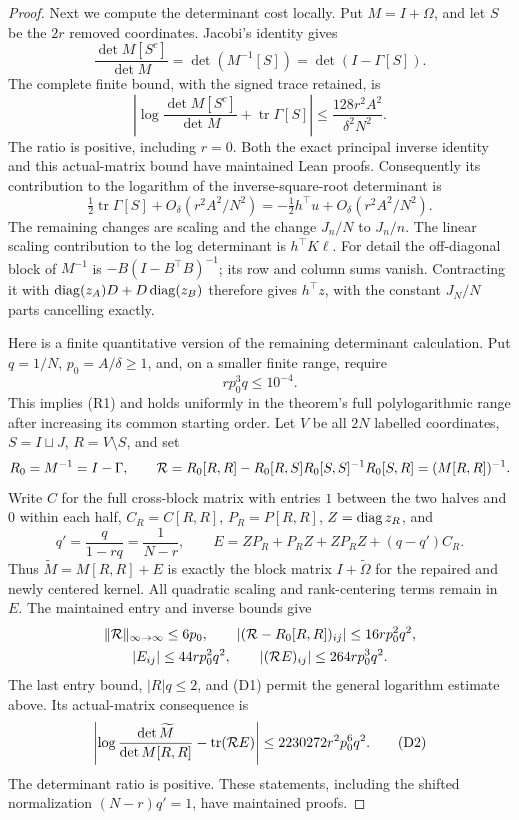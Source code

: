 \begin{proof}
Next we compute the determinant cost locally.
Put \(M=I+\Omega\), and let \(S\) be the \(2r\) removed
coordinates. Jacobi's identity gives
\[
 \frac{\det M[S^c]}{\det M}
     =\det(M^{-1}[S])
     =\det(I-\Gamma[S]).
\]
The complete finite bound, with the signed trace retained, is
\[
 \left|\log\frac{\det M[S^c]}{\det M}
             +\operatorname{tr}\Gamma[S]\right|
 \leq\frac{128r^2A^2}{\delta^2N^2}.
\]
The ratio is positive, including \(r=0\).
Both the exact principal inverse identity and this actual-matrix
bound have maintained Lean proofs. Consequently its contribution
to the logarithm of the inverse-square-root determinant is
\[
 \tfrac12\operatorname{tr}\Gamma[S]
       +O_\delta(r^2A^2/N^2)=-\tfrac12 h^\top u+
                                      O_\delta(r^2A^2/N^2).
\]
The remaining changes are scaling and the change
\(J_n/N\) to \(J_n/n\).
The linear scaling contribution to the log determinant is
\(h^\top K\ell\).
For detail the off-diagonal block of \(M^{-1}\) is
\(-B(I-B^\top B)^{-1}\); its row and column sums vanish.
Contracting it with \(\operatorname{diag}(z_A)D+D\operatorname{diag}(z_B)\)
therefore gives \(h^\top z\), with the constant \(J_N/N\)
parts cancelling exactly.

Here is a finite quantitative version of the remaining determinant
calculation. Put \(q=1/N\), \(p_0=A/\delta\geq1\), and, on a
smaller finite range, require
\[
 rp_0^3q\leq10^{-4}.
 \tag{D1}
\]
This implies (R1) and holds uniformly in the theorem's full
polylogarithmic range after increasing its common starting order.
Let \(V\) be all \(2N\) labelled coordinates, \(S=I\sqcup J\),
\(R=V\setminus S\), and set
\[
 R_0=M^{-1}=I-\Gamma,\qquad
 {\cal R}=R_0[R,R]-R_0[R,S]R_0[S,S]^{-1}R_0[S,R]
          =(M[R,R])^{-1}.
\]
Write \(C\) for the full cross-block matrix with entries \(1\)
between the two halves and \(0\) within each half,
\(C_R=C[R,R]\), \(P_R=P[R,R]\), \(Z=\operatorname{diag} z_R\), and
\[
 q'=\frac q{1-rq}=\frac1{N-r},\qquad
 E=ZP_R+P_RZ+ZP_RZ+(q-q')C_R .
\]
Thus \(\widetilde M=M[R,R]+E\) is exactly the block matrix
\(I+\widetilde\Omega\) for the repaired and newly centered kernel.
All quadratic scaling and rank-centering terms remain in \(E\).
The maintained entry and inverse bounds give
\[
 \begin{gathered}
 \|{\cal R}\|_{\infty\to\infty}\leq6p_0,\qquad
 |({\cal R}-R_0[R,R])_{ij}|\leq16rp_0^2q^2,\\
 |E_{ij}|\leq44rp_0^2q^2,\qquad
 |({\cal R}E)_{ij}|\leq264rp_0^3q^2.
 \end{gathered}
\]
The last entry bound, \(|R|q\leq2\), and (D1) permit the
general logarithm estimate above. Its actual-matrix consequence is
\[
 \left|\log\frac{\det\widetilde M}{\det M[R,R]}
                       -\operatorname{tr}({\cal R}E)\right|
       \leq2230272r^2p_0^6q^2.                 \tag{D2}
\]
The determinant ratio is positive. These statements, including
the shifted normalization \((N-r)q'=1\), have maintained proofs.


\end{proof}
